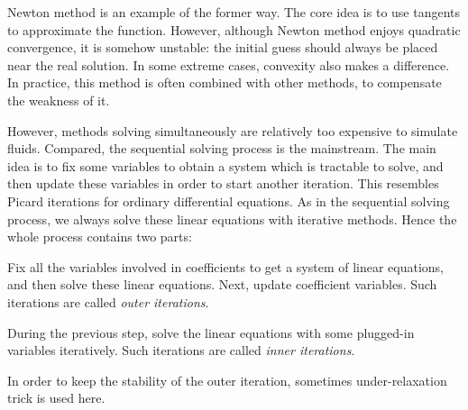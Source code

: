 \documentclass[english, nochinese]{pkupaper}
\begin{document}
Newton method is an example of the former way. The core idea is to use tangents to approximate the function. However, although Newton method enjoys quadratic convergence, it is somehow unstable: the initial guess should always be placed near the real solution. In some extreme cases, convexity also makes a difference. In practice, this method is often combined with other methods, to compensate the weakness of it.

However, methods solving simultaneously are relatively too expensive to simulate fluids. Compared, the sequential solving process is the mainstream. The main idea is to fix some variables to obtain a system which is tractable to solve, and then update these variables in order to start another iteration. This resembles Picard iterations for ordinary differential equations. As in the sequential solving process, we always solve these linear equations with iterative methods. Hence the whole process contains two parts:
\begin{partlist}
\item Fix all the variables involved in coefficients to get a system of linear equations, and then solve these linear equations. Next, update coefficient variables. Such iterations are called \emph{outer iterations}.
\item During the previous step, solve the linear equations with some plugged-in variables iteratively. Such iterations are called \emph{inner iterations}.
\end{partlist}
In order to keep the stability of the outer iteration, sometimes under-relaxation trick is used here.





\end{document}
